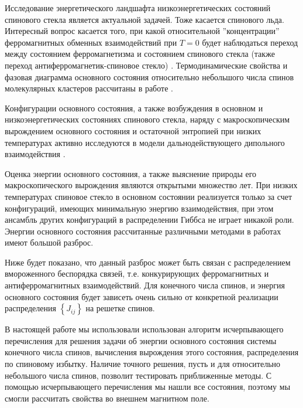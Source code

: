 \documentclass[utf8, babel, sor, jor, amsmath, amssymb, reprint]{elsarticle} %
\begin{document}
Исследование энергетического ландшафта низкоэнергетических состояний спинового стекла \cite{biswas2023energy} является актуальной задачей. Тоже касается спинового льда. Интересный вопрос касается того, при какой относительной ''концентрации''  ферромагнитных обменных взаимодействий при $T=0$ будет наблюдаться переход между состоянием ферро\-маг\-не\-тиз\-ма и состоянием спинового стекла (также переход анти\-ферро\-маг\-не\-тик-спиновое стекло) \cite{gruzberg2001random, honecker2001universality, picco2006strong, tsomokos2011interplay, zimmer2022role}. Термодинамические свойства и фазовая диаграмма основного состояния относительно небольшого числа спинов молекулярных кластеров рассчитаны в работе \cite{dias2023ground}.

Конфигурации основного состояния, а также возбуждения в основном и низкоэнергетических состояниях спинового стекла, наряду с макроскопическим вырождением основного состояния и остаточной энтропией  при низких температурах активно исследуются в модели дальнодействующего дипольного взаимодействия \cite{makarova2021low, singh2024micromagnetic}.

Оценка энергии основного состояния, а также выяснение природы его макроскопического вырождения являются открытыми множество лет. При низких температурах спиновое стекло в основном состоянии реализуется только за счет конфигураций, имеющих минимальную энергию взаимодействия, при этом ансамбль других конфигураций в распределении Гиббса не играет никакой роли. Энергии основного состояния рассчитанные различными методами в работах \cite{thouless1977solution, sherrington1975solvable, tanaka1980analytic, klein1976comparison, kirkpatrick1978infinite,  karandashev2019global, palmer1999ground, campbell2004energy, roma2009ground} имеют большой разброс.

Ниже будет показано, что данный разброс может быть связан с распределением вмороженного беспорядка связей, т.е. конкурирующих ферромагнитных и антиферромагнитных взаимодействий. 
Для конечного числа спинов, и энергия основного состояния будет зависеть очень сильно от конкретной реализации распределения $\left\lbrace J_{ij} \right\rbrace $ на решетке спинов. 

В настоящей работе мы использовали использован алгоритм исчерпывающего перечисления \cite{padalko2021parallel} для решения задачи об энергии основного состояния системы конечного числа спинов, вычисления вырождения этого состояния, распределения по спиновому избытку. Наличие точного решения, пусть и для относительно небольшого числа спинов, позволит тестировать приближенные методы. С помощью исчерпывающего перечисления мы нашли все состояния, поэтому мы смогли рассчитать свойства во внешнем магнитном поле. 
\end{document}
